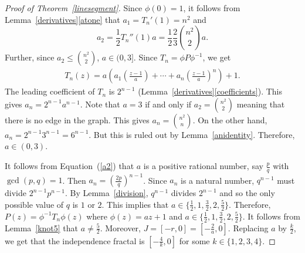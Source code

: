 \documentclass[12pt,a4paper]{article}
\theoremstyle{plain}
\numberwithin{equation}{section}
\begin{document}
\begin{proof}[Proof of Theorem~\ref{linesegment}]
  	Since $\phi(0)=1$, it follows from Lemma~\ref{derivatives}\ref{atone} that  $a_1 =T_n '(1)=n^2$ and 
  	\begin{equation}
  		a_2 =\frac{1}{2} T_n ''(1)a= \frac{1}{2} \frac{2}{3} \binom{n^2}{2}a.
  		\label{a2}
  	\end{equation}
  	Further, since $a_2 \leq \binom{n^2}{2}$, $ a \in (0,3] $. Since  $T_n = \phi P \phi ^{-1}$, we get
  	\begin{align*}
  		T_n(z)= a \left(a_1 \left(\frac{z-1}{a}\right) + \cdots + a_n \left(\frac{z-1}{a}\right)^n \right) + 1.
  	\end{align*}
  	The leading coefficient of $T_n$ is $2^{n-1}$ (Lemma~\ref{derivatives}\ref{coefficients}). 
  	This gives $a_n=2^{n-1}a^{n-1}$. Note that $a=3$  if and only if $a_2=\binom{n^2}{2}$ meaning that there is no edge in the graph. This gives $a_n =\binom{n^2}{n}$. On the other hand, $a_n=2^{n-1}3^{n-1}=6^{n-1}$. But this is ruled out by Lemma~\ref{anidentity}. 
  	Therefore, $a \in (0,3)$.
  	\par 
  	It follows from Equation~(\ref{a2}) that $a$ is a positive rational number, say $\frac{p}{q}$ with $\gcd(p,q)=1$. 
  	Then $a_n=(\frac{2p}{q})^{n-1} $. Since $a_n$ is a natural number, $q^{n-1}$ must divide $2^{n-1}p^{n-1}$. By Lemma~\ref{division}, $q^{n-1}$ divides $2^{n-1}$ and so the only possible value of $q$ is $1$ or $2$. This implies that $a \in \{\frac{1}{2}, 1, \frac{3}{2},2, \frac{5}{2} \}$. Therefore, $P(z)=\phi^{-1} T_n \phi(z)$ where $\phi(z)=az +1$ and $a \in \{\frac{1}{2}, 1, \frac{3}{2}, 2, \frac{5}{2}  \} $. It follows from  Lemma~\ref{knot5} that $a \neq \frac{5}{2}$.  Moreover, $J=[-r, 0] = [-\frac{2}{a}, 0]$. Replacing $a$ by $\frac{k}{2}$, we get that the independence fractal is $[-\frac{4}{k},0]$ for some $k \in \{1,2,3,4\}$.  

\end{proof}
\end{document}

